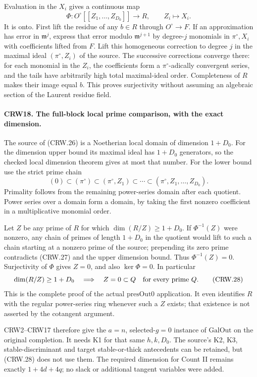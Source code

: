 Evaluation in the $X_i$ gives a continuous map
\[
 \Phi:O^\circ[[Z_1,\ldots,Z_{D_0}]]\longrightarrow R,
 \qquad Z_i\longmapsto X_i.                        \tag{CRW.26}
\]
It is onto.  First lift the residue of any $b\in R$
through $O^\circ\to F$.  If an approximation has
error in $\mathfrak m^j$, express that error modulo
$\mathfrak m^{j+1}$ by degree-$j$ monomials in
$\pi^\circ,X_i$ with coefficients lifted from $F$.
Lift this homogeneous correction to degree $j$ in
the maximal ideal $(\pi^\circ,Z_i)$ of the source.
The successive corrections converge there: for each
monomial in the $Z_i$, the coefficients form a
$\pi^\circ$-adically convergent series, and the tails
have arbitrarily high total maximal-ideal order.
Completeness of $R$ makes their image equal $b$.
This proves surjectivity without assuming an algebraic
section of the Laurent residue field.

\paragraph{CRW18. The full-block local prime comparison, with the exact dimension.}
\label{claim:CRW18}
The source of (CRW.26) is a Noetherian local domain
of dimension $1+D_0$.
For the dimension upper bound its maximal ideal has
$1+D_0$ generators, so the checked local dimension
theorem gives at most that number.
For the lower bound use the strict prime chain
\[
 (0)\subset(\pi^\circ)\subset
 (\pi^\circ,Z_1)\subset\cdots\subset
 (\pi^\circ,Z_1,\ldots,Z_{D_0}).                  \tag{CRW.27}
\]
Primality follows from the remaining power-series
domain after each quotient.  Power series over a
domain form a domain, by taking the first nonzero
coefficient in a multiplicative monomial order.

Let $Z$ be any prime of $R$ for which
$\dim(R/Z)\ge1+D_0$.  If $\Phi^{-1}(Z)$ were
nonzero, any chain of primes of length $1+D_0$ in
the quotient would lift to such a chain starting
at a nonzero prime of the source; prepending its
zero prime contradicts (CRW.27) and the upper
dimension bound.  Thus $\Phi^{-1}(Z)=0$.
Surjectivity of $\Phi$ gives $Z=0$, and also
$\ker\Phi=0$.  In particular
\[
 \dim(R/Z)\ge1+D_0\quad\Longrightarrow\quad
 Z=0\subset Q\quad\hbox{for every prime }Q.         \tag{CRW.28}
\]
This is the complete proof of the actual
$\mathrm{presOut0}$ application.  It even identifies
$R$ with the regular power-series ring whenever
such a $Z$ exists; that existence is not asserted
by the cotangent argument.

CRW2--CRW17 therefore give the $a=n$, selected-$g=0$
instance of $\mathrm{GalOut}$ on the original
completion.  It needs K1 for that same $h,k,D_0$.
The source's K2, K3, stable-discriminant and target
stable-or-thick antecedents can be retained, but
(CRW.28) does not use them.  The required dimension
for Count II remains exactly $1+4d+4q$;
no slack or additional tangent variables were added.

